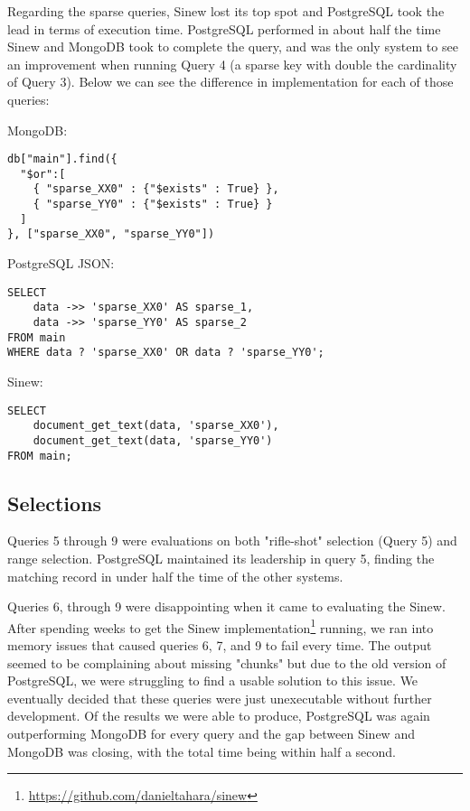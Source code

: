 \documentclass[sigconf]{acmart}
\begin{document}
Regarding the sparse queries, Sinew lost its top spot and PostgreSQL took the lead in terms of execution time. PostgreSQL performed in about half the time Sinew and MongoDB took to complete the query, and was the only system to see an improvement when running Query 4 (a sparse key with double the cardinality of Query 3). Below we can see the difference in implementation for each of those queries:

\noindent
MongoDB:
\begin{tcolorbox}[colback=gray!10, colframe=gray!50, sharp corners, boxrule=0.1mm]
\begin{verbatim} 
db["main"].find({
  "$or":[ 
    { "sparse_XX0" : {"$exists" : True} },
    { "sparse_YY0" : {"$exists" : True} } 
  ] 
}, ["sparse_XX0", "sparse_YY0"])
\end{verbatim}
\end{tcolorbox}

\noindent
PostgreSQL JSON:
\begin{tcolorbox}[colback=gray!10, colframe=gray!50, sharp corners, boxrule=0.1mm]
\begin{verbatim} 
SELECT 
    data ->> 'sparse_XX0' AS sparse_1,
    data ->> 'sparse_YY0' AS sparse_2
FROM main
WHERE data ? 'sparse_XX0' OR data ? 'sparse_YY0';
\end{verbatim}
\end{tcolorbox}

\noindent
Sinew:
\begin{tcolorbox}[colback=gray!10, colframe=gray!50, sharp corners, boxrule=0.1mm]
\begin{verbatim} 
SELECT 
    document_get_text(data, 'sparse_XX0'),
    document_get_text(data, 'sparse_YY0') 
FROM main;
\end{verbatim}
\end{tcolorbox}

\subsection{Selections}

Queries 5 through 9 were evaluations on both "rifle-shot" selection (Query 5) and range selection. PostgreSQL maintained its leadership in query 5, finding the matching record in under half the time of the other systems. 

Queries 6, through 9 were disappointing when it came to evaluating the Sinew. After spending weeks to get the Sinew implementation\footnote{\url{https://github.com/danieltahara/sinew}} running, we ran into memory issues that caused queries 6, 7, and 9 to fail every time. The output seemed to be complaining about missing "chunks" but due to the old version of PostgreSQL, we were struggling to find a usable solution to this issue. We eventually decided that these queries were just unexecutable without further development. Of the results we were able to produce, PostgreSQL was again outperforming MongoDB for every query and the gap between Sinew and MongoDB was closing, with the total time being within half a second.
\end{document}
